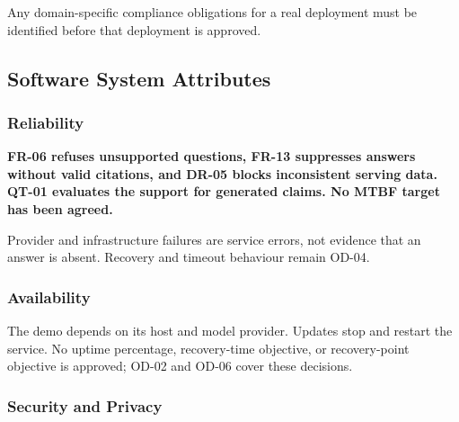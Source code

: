 \documentclass[11pt,letterpaper]{article}
\begin{document}
Any domain-specific compliance obligations for a real deployment must be identified before that deployment is approved.\par

\subsection{Software System Attributes}

\subsubsection{Reliability}


\textbf{FR-06 refuses unsupported questions, FR-13 suppresses answers without valid citations, and DR-05 blocks inconsistent serving data. QT-01 evaluates the support for generated claims. No MTBF target has been agreed.}\par

Provider and infrastructure failures are service errors, not evidence that an answer is absent. Recovery and timeout behaviour remain OD-04.\par

\subsubsection{Availability}

The demo depends on its host and model provider. Updates stop and restart the service. No uptime percentage, recovery-time objective, or recovery-point objective is approved; OD-02 and OD-06 cover these decisions.\par

\subsubsection{Security and Privacy}

\begingroup\small
\end{document}
